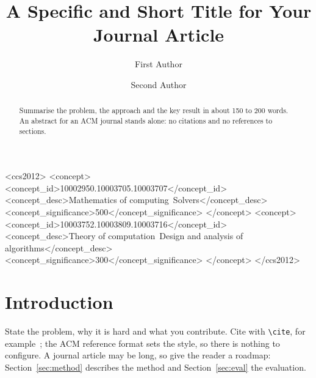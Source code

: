 \documentclass[acmsmall]{acmart}
\begin{document}
\title{A Specific and Short Title for Your Journal Article}

\author{First Author}

\author{Second Author}

\renewcommand{\shortauthors}{First Author and Second Author}

\begin{abstract}
Summarise the problem, the approach and the key result in about 150 to 200 words. An
abstract for an ACM journal stands alone: no citations and no references to sections.
\end{abstract}

\begin{CCSXML}
<ccs2012>
 <concept>
  <concept_id>10002950.10003705.10003707</concept_id>
  <concept_desc>Mathematics of computing~Solvers</concept_desc>
  <concept_significance>500</concept_significance>
 </concept>
 <concept>
  <concept_id>10003752.10003809.10003716</concept_id>
  <concept_desc>Theory of computation~Design and analysis of algorithms</concept_desc>
  <concept_significance>300</concept_significance>
 </concept>
</ccs2012>
\end{CCSXML}


\maketitle

\section{Introduction}
State the problem, why it is hard and what you contribute. Cite with \verb|\cite|, for
example~\cite{knuth84}; the ACM reference format sets the style, so there is nothing
to configure. A journal article may be long, so give the reader a roadmap: Section~\ref{sec:method}
describes the method and Section~\ref{sec:eval} the evaluation.
\end{document}
